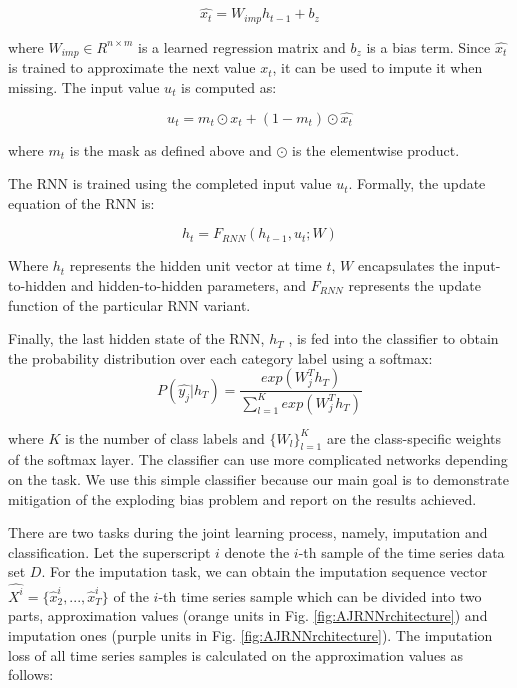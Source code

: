 \begin{equation}
  \hat{x_t} = W_{imp} h_{t-1} + b_z
\end{equation}

where $W_{imp} \in R^{n \times  m}$ is a learned regression matrix and $b_z$ is a bias term. 
Since $\hat{x_t}$ is trained to approximate the next value $x_t$, it can be used to impute it when missing. 
The input value $u_t$ is computed as:

\begin{equation}
  u_t = m_t \odot x_t + (1 - m_t) \odot \hat{x_t}
  \label{eq:AJRNNinput}
\end{equation}

where $m_t$ is the mask as defined above and $\odot$ is the elementwise product.

The RNN is trained using the completed input value $u_t$.
Formally, the update equation of the RNN is:

\begin{equation}
  h_t = F_{RNN} (h_{t-1}, u_t; W)
\end{equation}

Where $h_t$ represents the hidden unit vector at time $t$, $W$ encapsulates the input-to-hidden and hidden-to-hidden parameters, and $F_{RNN}$ represents the update function of the particular RNN variant.

Finally, the last hidden state of the RNN, $h_T$ , is fed into the classifier to obtain the probability distribution over each category label using a softmax:
\begin{equation}
  P(\hat{y_j}|h_T ) = \frac{exp(W^T_j  h_T )}{\sum_{l=1}^K exp(W^T_j  h_T )}
  \label{eq:AJRNNsoftmax}
\end{equation}

where $K$ is the number of class labels and $\{W_l\}^K_{l=1}$ are the class-specific weights of the softmax layer.
The classifier can use more complicated networks depending on the task.
We use this simple classifier because our main goal is to demonstrate mitigation of the exploding bias problem and report on the results achieved.

There are two tasks during the joint learning process, namely, imputation and classification. 
Let the superscript $i$ denote the $i$-th sample of the time series data set $D$.
For the imputation task, we can obtain the imputation sequence vector $\hat{X^i} = \{ \hat{x}^i_2, ..., \hat{x}^i_T \}$ 
of the $i$-th time series sample which can be divided into two parts, approximation values
(orange units in Fig. \ref{fig:AJRNNrchitecture}) and imputation ones (purple units
in Fig. \ref{fig:AJRNNrchitecture}). 
The imputation loss of all time series samples is calculated on the approximation values as follows:

